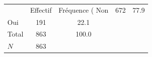 {
\def\sym#1{\ifmmode^{#1}\else\(^{#1}\)\fi}
\begin{tabular}{l*{1}{cc}}
\toprule
            &    Effectif&Fréquence (%
\midrule
Non         &         672&        77.9\\
Oui         &         191&        22.1\\
Total       &         863&       100.0\\
\midrule
\(N\)       &         863&            \\
\bottomrule
\end{tabular}
}
